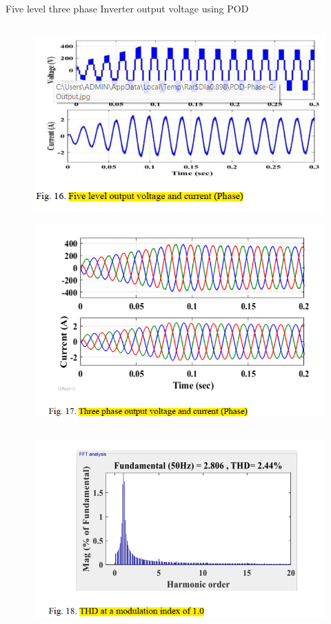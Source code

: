 \documentclass[
	11pt, %
]{beamer}
\begin{document}
\begin{frame}{Five level three phase Inverter output voltage using POD}
	\begin{column}{0.5\textwidth}
		\begin{figure}
			\includegraphics[width=1\linewidth]{POD_V_C.png}
		\end{figure}
		\begin{figure}
			\includegraphics[width=1\linewidth]{POD_V_C_3.png}
		\end{figure}
	\end{column}
	\begin{column}{0.5\textwidth}
		\begin{figure}
			\includegraphics[width=1\linewidth]{POD_THD.png}

\end{figure}
\end{column}
\end{frame}
\end{document}

